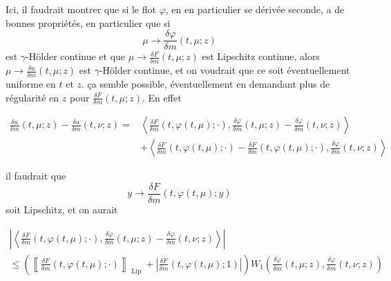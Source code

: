 \documentclass[a4paper,11pt, reqno]{amsart}
\newcommand{\red}[1]{{\color{red} #1}}
\newcommand{\1}{\mathbbm{1}}
\theoremstyle{plain}
\theoremstyle{definition}
\begin{document}
\red{Ici, il faudrait montrer que si le flot $\varphi$, en en
particulier se d{\'e}riv{\'e}e seconde, a de bonnes propri{\'e}t{\'e}s, en
particulier que si
\[ \mu \rightarrow \frac{\delta \varphi}{\delta m} (t, \mu ; z) \]
est $\gamma$-H{\"o}lder continue et que $\mu \rightarrow \frac{\delta
F}{\delta m} (t, \mu ; z)$ est Lipschitz continue, alors $\mu \rightarrow
\frac{\delta u}{\delta m} (t, \mu ; z)$ est $\gamma$-H{\"o}lder continue, et
on voudrait que ce soit {\'e}ventuellement uniforme en $t$ et $z$. {\c c}a
semble possible, {\'e}ventuellement en demandant plus de r{\'e}gularit{\'e} en
$z$ pour $\frac{\delta F}{\delta m} (t, \mu ; z)$. En effet

\begin{align*}
  \frac{\delta u}{\delta m} (t, \mu ; z) - \frac{\delta u}{\delta m} (t, \nu ;
  z) = & \left\langle \frac{\delta F}{\delta m} (t, \varphi (t, \mu) ;
  \cdot), \frac{\delta \varphi}{\delta m} (t, \mu ; z) - \frac{\delta
  \varphi}{\delta m} (t, \nu ; z) \right\rangle\\
  & + \left\langle \frac{\delta F}{\delta m} (t, \varphi (t, \mu) ; \cdot)
  - \frac{\delta F}{\delta m} (t, \varphi (t, \mu) ; \cdot), \frac{\delta
  \varphi}{\delta m} (t, \nu ; z) \right\rangle
\end{align*}

il faudrait que
\[ y \rightarrow \frac{\delta F}{\delta m} (t, \varphi (t, \mu) ; y) \]
soit Lipschitz, et on aurait

\begin{multline*}
  \left| \left\langle \frac{\delta F}{\delta m} (t, \varphi (t, \mu) ;
  \cdot), \frac{\delta \varphi}{\delta m} (t, \mu ; z) - \frac{\delta
  \varphi}{\delta m} (t, \nu ; z) \right\rangle \right|\\
  \le \left( \left\llbracket \frac{\delta F}{\delta m} (t, \varphi (t,
  \mu) ; \cdot) \right\rrbracket_{ \text{ Lip } } + \left| \frac{\delta
  F}{\delta m} (t, \varphi (t, \mu) ; 1) \right| \right) W_1 \left(
  \frac{\delta \varphi}{\delta m} (t, \mu ; z), \frac{\delta \varphi}{\delta
  m} (t, \nu ; z) \right)
\end{multline*}

}
\end{document}
